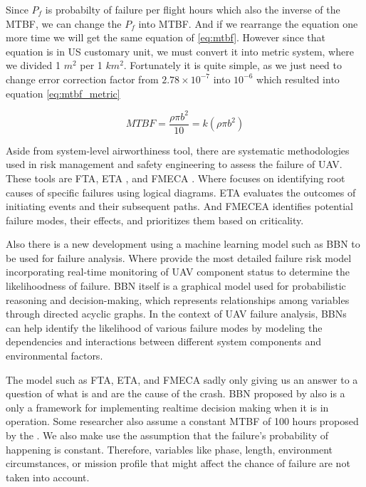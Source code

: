 \documentclass[12pt]{report}
\begin{document}
            Since \(P_f\) is probabilty of failure per flight hours which also the inverse of the \ac{MTBF}, we can
            change the \(P_f\) into MTBF. And if we rearrange the equation one more time we will get the same equation
            of \ref{eq:mtbf}. However since that equation is in US customary unit, we must convert it into metric
            system, where we divided 1 \(m^2\) per 1 \(km^2\). Fortunately it is quite simple, as we just need to change
            error correction factor from \(2.78 \times 10^{-7}\) into \(10^{-6}\) which resulted into equation
            \ref{eq:mtbf_metric}

            \begin{equation}\label{eq:mtbf_metric}
                MTBF = \frac{\rho \pi b^2}{10} = k(\rho \pi b^2)
            \end{equation}

            Aside from system-level airworthiness tool, there are systematic methodologies used in risk management and
            safety engineering to assess the failure of UAV. These tools are \ac{FTA}, \ac{ETA} , and \ac{FMECA}
            \cite{barr_preliminary_2017}. Where focuses on identifying root causes of specific failures using logical
            diagrams. ETA evaluates the outcomes of initiating events and their subsequent paths. And FMECEA identifies
            potential failure modes, their effects, and prioritizes them based on criticality.

            Also there is a new development using a machine learning model such as \ac{BBN} \cite{ancel_real-time_2017}
            to be used for failure analysis. Where \cite{ancel_real-time_2017} provide the most detailed failure risk
            model incorporating real-time monitoring of UAV component status to determine the likelihoodness of failure.
            BBN itself is a graphical model used for probabilistic reasoning and decision-making, which represents
            relationships among variables through directed acyclic graphs. In the context of UAV failure analysis, BBNs
            can help identify the likelihood of various failure modes by modeling the dependencies and interactions
            between different system components and environmental factors.

            The model such as FTA, ETA, and FMECA sadly only giving us an answer to a question of what is and are the
            cause of the crash. BBN proposed by \cite{ancel_real-time_2017} also is a only a framework for implementing
            realtime decision making when it is in operation. Some researcher also assume a  constant MTBF of 100 hours
            proposed by the \cite{arc_unmanned_2015}.  We also make  use the assumption that the failure's probability
            of happening is constant. Therefore, variables like phase, length, environment circumstances, or mission
            profile that might affect the chance of failure are not taken into account.
\end{document}

